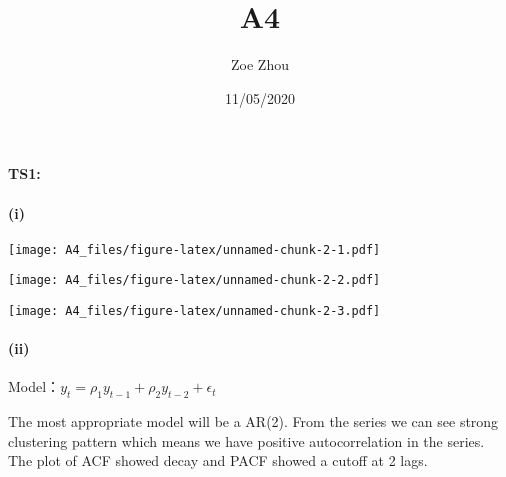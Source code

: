 \documentclass[]{article}
\title{A4}
\author{Zoe Zhou}
\date{11/05/2020}
\newenvironment{Shaded}{\begin{snugshade}}{\end{snugshade}}
\newcommand{\DataTypeTok}[1]{\textcolor[rgb]{0.13,0.29,0.53}{#1}}
\newcommand{\KeywordTok}[1]{\textcolor[rgb]{0.13,0.29,0.53}{\textbf{#1}}}
\newcommand{\NormalTok}[1]{#1}
\newcommand{\OperatorTok}[1]{\textcolor[rgb]{0.81,0.36,0.00}{\textbf{#1}}}
\newcommand{\StringTok}[1]{\textcolor[rgb]{0.31,0.60,0.02}{#1}}
\let\oldparagraph\paragraph
\renewcommand{\paragraph}[1]{\oldparagraph{#1}\mbox{}}
\begin{document}
\maketitle

\hypertarget{ts1}{%
\paragraph{TS1:}\label{ts1}}

\hypertarget{i}{%
\paragraph{(i)}\label{i}}

\begin{Shaded}
\end{Shaded}

\texttt{[image: A4\_files/figure-latex/unnamed-chunk-2-1.pdf]}

\begin{Shaded}
\end{Shaded}

\texttt{[image: A4\_files/figure-latex/unnamed-chunk-2-2.pdf]}

\begin{Shaded}
\end{Shaded}

\texttt{[image: A4\_files/figure-latex/unnamed-chunk-2-3.pdf]}

\hypertarget{ii}{%
\paragraph{(ii)}\label{ii}}

Model：\(y_t = \rho_1y_{t-1} + \rho_2y_{t-2} + \epsilon_t\)

The most appropriate model will be a AR(2). From the series we can see
strong clustering pattern which means we have positive autocorrelation
in the series. The plot of ACF showed decay and PACF showed a cutoff at
2 lags.
\end{document}
